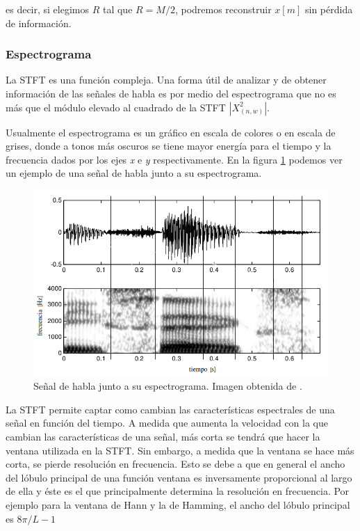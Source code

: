 es decir, si elegimos $R$ tal que $R = M/2$, podremos reconstruir $x[m]$ sin pérdida de información.

\subsubsection{Espectrograma}
\label{sec:espectrograma}

La STFT es una función compleja. Una forma útil de analizar y de obtener información de las señales de habla es por medio del espectrograma que no es más que el módulo elevado al cuadrado de la STFT $|X_{(n, w)}^2|$. 

Usualmente el espectrograma es un gráfico en escala de colores o en escala de grises, donde a tonos más oscuros se tiene mayor energía para el tiempo y la frecuencia dados por los ejes \emph{x} e \emph{y} respectivamente. En la figura \ref{fig:ch2_spectrogram} podemos ver un ejemplo de una señal de habla junto a su espectrograma.

\begin{figure}[H]
	\centering
	\centerline{\includegraphics[scale=0.6]{images/ch2/spectrogram.png}}
	\caption{Señal de habla junto a su espectrograma. Imagen obtenida de \cite{spoken_language_processing}.}
	\label{fig:ch2_spectrogram}
\end{figure}

La STFT permite captar como cambian las características espectrales de una señal en función del tiempo. A medida que aumenta la velocidad con la que cambian las características de una señal, más corta se tendrá que hacer la ventana utilizada en la STFT. Sin embargo, a medida que la ventana se hace más corta, se pierde resolución en frecuencia. Esto se debe a que en general el ancho del lóbulo principal de una función ventana es inversamente proporcional al largo de ella y éste es el que principalmente determina la resolución en frecuencia.  Por ejemplo para la ventana de Hann y la de Hamming, el ancho del lóbulo principal es $8 \pi/L - 1$ \cite{oppenheim_schafer} 

